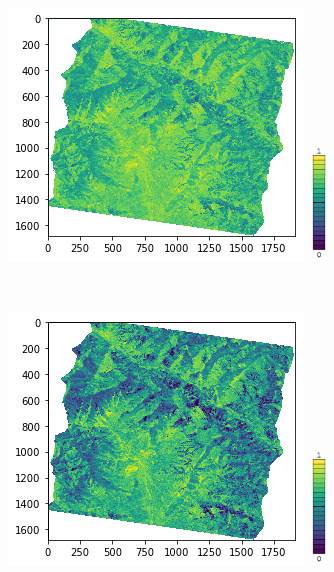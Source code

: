 \begin{figure}
\centering
\begin{subfigure}[b]{0.45\textwidth}
\includegraphics[width=\textwidth]{Figures/SnowCover2018/0_og}~\includegraphics[height=3cm]{Figures/SnowCover2018/scale} 
\caption{}
\end{subfigure}
~\quad
\begin{subfigure}[b]{0.45\textwidth}
\includegraphics[width=\textwidth]{Figures/SnowCover2018/0}~\includegraphics[height=3cm]{Figures/SnowCover2018/scale}

\end{subfigure}
\end{figure}
